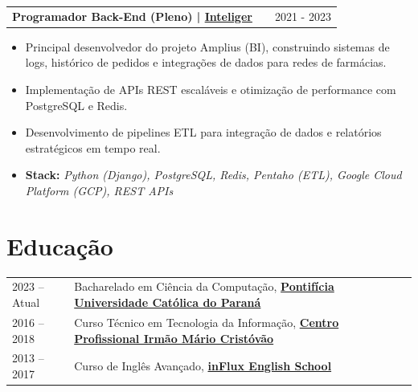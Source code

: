\documentclass[a4paper,12pt]{article}
\makeatletter
\newenvironment{joblong}[2]
{
    \begin{tabularx}{\linewidth}{@{}l X r@{}}
        \textbf{#1} & \hfill & #2 \\[3.75pt]
    \end{tabularx}
    \begin{minipage}[t]{\linewidth}
    }
    {
    \end{minipage}
}
\newenvironment{bullets}
{
    \begin{itemize}[nosep,after=\strut, leftmargin=1em, itemsep=3pt,label=--]
    }
    {
    \end{itemize}
}
\makeatother
\begin{document}
    \begin{joblong}{Programador Back-End (Pleno) | \href{https://inteliger.com.br}{\textbf{Inteliger}}}{2021 - 2023}
        \begin{bullets}
            \item Principal desenvolvedor do projeto Amplius (BI), construindo sistemas de logs, histórico de pedidos e integrações de dados para redes de farmácias.
            \item Implementação de APIs REST escaláveis e otimização de performance com PostgreSQL e Redis.
            \item Desenvolvimento de pipelines ETL para integração de dados e relatórios estratégicos em tempo real.
            \item \textbf{Stack:} \textit{Python (Django), PostgreSQL, Redis, Pentaho (ETL), Google Cloud Platform (GCP), REST APIs}
        \end{bullets}
    \end{joblong}







    \section{Educação}
    \begin{tabularx}{\linewidth}{@{}l X@{}}
        2023 -- Atual & Bacharelado em Ciência da Computação, \href{https://www.pucpr.br}{\textbf{Pontifícia Universidade Católica do Paraná}} \\
        2016 -- 2018 & Curso Técnico em Tecnologia da Informação, \href{http://www.tecpuc.com.br}{\textbf{Centro Profissional Irmão Mário Cristóvão}} \\
        2013 -- 2017 & Curso de Inglês Avançado, \href{http://www.influx.com.br}{\textbf{inFlux English School}} \\
    \end{tabularx}
\end{document}
